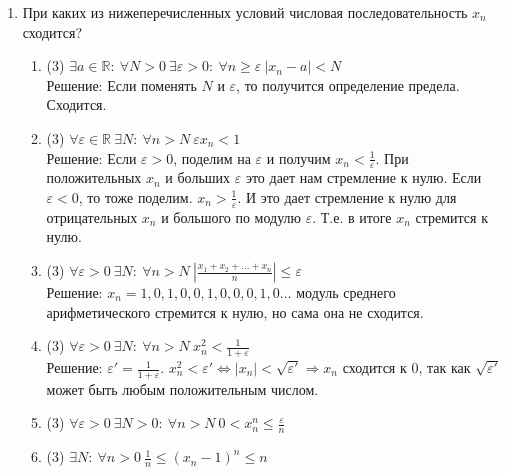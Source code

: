 \documentclass[a4paper]{article}
\def\eps{\varepsilon}
\begin{document}
\begin{enumerate}
\begin{enumerate}
        С $n > 10$ точно выполняется, что знаменатель > 1, поэтому:
        $\ 2|\frac{1 - \sqrt[3]{1 + \frac{2}{n} - \frac{1}{n^2}} + 1 - \sqrt[3]{1 - \frac{1}{n^2}} + 1 - \sqrt[3]{1 - \frac{2}{n} - \frac{1}{n^2}}}{3(\sqrt[3]{1 + \frac{2}{n} - \frac{1}{n^2}} + \sqrt[3]{1 - \frac{1}{n^2}} + \sqrt[3]{1 - \frac{2}{n} - \frac{1}{n^2}})}| \le
        2|1 - \sqrt[3]{1 + \frac{2}{n} - \frac{1}{n^2}} + 1 - \sqrt[3]{1 - \frac{1}{n^2}} + 1 - \sqrt[3]{1 - \frac{2}{n} - \frac{1}{n^2}}| \le
        2|3 - \sqrt[3]{1 + \frac{2}{n} - \frac{1}{n^2}}| \le 2|3 - \sqrt[3]{1 + \frac{2}{n} -\frac{1}{n^2}}| \le
        2|3 + \sqrt[3]{\frac{1}{n^2}}|$. $2|3 + \sqrt[3]{\frac{1}{n^2}}| < \eps \Leftrightarrow
        3 + \sqrt[3]{\frac{1}{n^2}} < \frac{\eps}{2} \Leftrightarrow \frac{1}{n^2} < (\frac{\eps}{2} - 3)^3$. При $\eps \ge \frac{3}{2}$ можно брать $n = 10$ и все будет хорошо. Дальше рассматриваем $\eps < \frac{3}{2}$
        \item (4) $x_n = \frac{(n-1)(n-2)\cdot\dots\cdot (n-10)}{(n+1)(n+2)\cdot\dots\cdot(n+10)}$
    \end{enumerate}
    
	\item При каких из нижеперечисленных условий числовая последовательность $x_n$ сходится?
	\begin{enumerate}
	    \item (3) $\exists a\in \mathbb R:\ \forall N>0\ \exists \eps>0:\ \forall n\geq\eps\ |x_n - a|<N$\\
        Решение: Если поменять $N$ и $\eps$, то получится определение предела. Сходится.
	    \item (3) $\forall \eps\in \mathbb R\ \exists N:\ \forall n>N\ \eps x_n < 1$\\
	    Решение: Если $\eps > 0$, поделим на $\eps$ и получим $x_n < \frac{1}{\eps}$. При положительных $x_n$ и больших $\eps$ это дает нам стремление к нулю. Если $\eps < 0$, то тоже поделим. $x_n > \frac{1}{\eps}$. И это дает стремление к нулю для отрицательных $x_n$ и большого по модулю $\eps$. Т.е. в итоге $x_n$ стремится к нулю.
	    \item (3) $\forall \eps>0\ \exists N:\ \forall n>N\ \left|\frac{x_1+x_2+\dots + x_n}{n}\right|\leq \eps$\\
	    Решение: $x_n = 1, 0, 1, 0, 0, 1, 0, 0, 0, 1, 0 \dots$ модуль среднего арифметического стремится к нулю, но сама она не сходится.
	    \item (3) $\forall \eps>0\ \exists N:\ \forall n>N\ x_n^2<\frac{1}{1+\eps}$\\
	    Решение: $\eps' = \frac{1}{1+\eps}$. $x_n^2 < \eps' \Leftrightarrow |x_n| < \sqrt{\eps'} \Rightarrow x_n$ сходится к 0, так как $\sqrt{\eps'}$ может быть любым положительным числом.
	    \item (3) $\forall\eps>0\ \exists N>0:\ \forall n>N\ 0<x_n^n\leq \frac{\eps}{n}$
	    \item (3) $\exists N:\ \forall n>0\ \frac{1}{n}\leq (x_n - 1)^n \leq n$
	\end{enumerate}
    

\end{enumerate}
\end{document}
